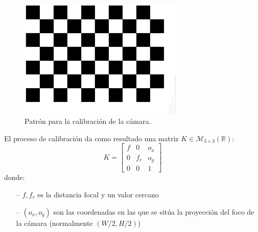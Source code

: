 \documentclass[12pt]{article}
\begin{document}
\begin{figure}[h!]
    \centering
    \includegraphics[width=0.7\textwidth]{images_calibracion/Patron_calibracion.png}  %
    \caption{Patrón para la calibración de la cámara.}
    \label{fig:cuadricula}
\end{figure}

El proceso de calibración da como resultado una matriz $K \in \mathcal{M}_{3 \times 3} (\mathbb{R})$:
$$
K=
\begin{bmatrix}
f & 0 & o_x \\
0 & f_r & o_y \\
0 & 0 & 1
\end{bmatrix}
$$
donde:
\begin{itemize}
    \item[--] $f, f_r$ es la distancia focal y un valor cercano
    \item[--] $(o_x,o_y)$ son las coordenadas en las que se sitúa la proyección del foco de la cámara (normalmente $(W/2,H/2)$)
\end{itemize}
\end{document}
